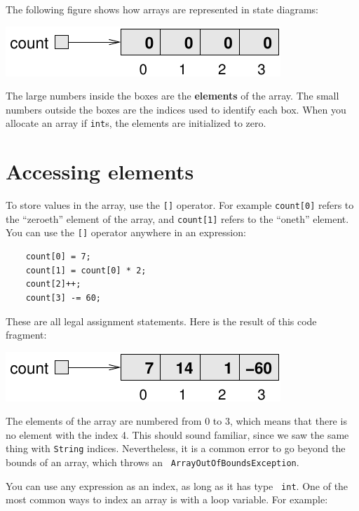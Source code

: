 \documentclass[12pt]{book}
\theoremstyle{exercise}
\begin{document}

The following figure shows how arrays are represented in state
diagrams:


\includegraphics{figs/array.pdf}


The large numbers inside the boxes are the {\bf elements} of
the array.  The small numbers outside the boxes are the
indices used to identify each box.  When you allocate an
array if {\tt int}s, the elements are initialized to zero.


\section{Accessing elements}

To store values in the array, use the
{\tt []} operator.  For example {\tt count[0]} refers to the
``zeroeth'' element of the array, and {\tt count[1]} refers to the
``oneth'' element.  You can use the {\tt []} operator anywhere in an
expression:

\begin{lstlisting}
    count[0] = 7;
    count[1] = count[0] * 2;
    count[2]++;
    count[3] -= 60;
\end{lstlisting}
%
These are all legal assignment statements.  Here is the
result of this code fragment:


\includegraphics{figs/array2.pdf}


The elements of the array
are numbered from 0 to 3, which means that there is no element with
the index 4.  This should sound familiar, since we saw the same thing
with {\tt String} indices.  Nevertheless, it is a common error to go
beyond the bounds of an array, which throws an {\tt
ArrayOutOfBoundsException}.

You can use any expression as an index, as long as it has type {\tt
int}.  One of the most common ways to index an array is with a loop
variable.  For example:
\end{document}
